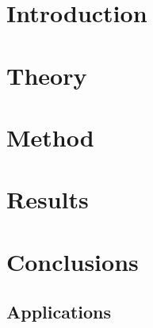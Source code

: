 \documentclass[paper=A4,DIV=calc]{scrbook}
\theoremstyle{plain}
\theoremstyle{definition}
\begin{document}
	\frontmatter
	\makefrontmatter

	\cleardoublepage
	\tableofcontents
	

	\mainmatter
	\chapter{Introduction}
	
	
	

	\chapter{Theory}
	
	
	
	

	\chapter{Method}
	
	
	

	\chapter{Results}
	
	
	


	\chapter{Conclusions}
	\section{Applications}

	\nocite{*}
	\printglossary[type=\acronymtype,]
	\printbibliography[heading=bibintoc]
	\backmatter
\end{document}
